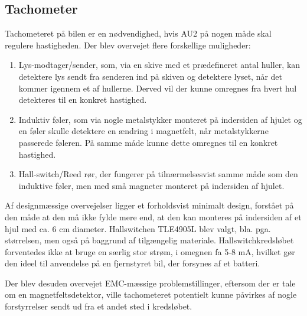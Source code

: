 \subsection{Tachometer}

Tachometeret på bilen er en nødvendighed, hvis AU2 på nogen måde skal regulere hastigheden. Der blev overvejet flere forskellige muligheder:
\begin{enumerate}
	\item Lys-modtager/sender, som, via en skive med et prædefineret antal huller, kan detektere lys sendt fra senderen ind på skiven og detektere lyset, når det kommer igennem et af hullerne. Derved vil der kunne omregnes fra hvert hul detekteres til en konkret hastighed.
	\item Induktiv føler, som via nogle metalstykker monteret på indersiden af hjulet og en føler skulle detektere en ændring i magnetfelt, når metalstykkerne passerede føleren. På samme måde kunne dette omregnes til en konkret hastighed.
	\item Hall-switch/Reed rør, der fungerer på tilnærmelsesvist samme måde som den induktive føler, men med små magneter monteret på indersiden af hjulet. 
\end{enumerate}

Af designmæssige overvejelser ligger et forholdsvist minimalt design, forstået på den måde at den må ikke fylde mere end, at den kan monteres på indersiden af et hjul med ca. 6 cm diameter. Hallswitchen TLE4905L \cite{lib:tacho} blev valgt, bla. pga. størrelsen, men også på baggrund af tilgængelig materiale. Hallswitchkredsløbet forventedes ikke at bruge en særlig stor strøm, i omegnen fa 5-8 mA, hvilket gør den ideel til anvendelse på en fjernstyret bil, der forsynes af et batteri. 

Der blev desuden overvejet EMC-mæssige problemstillinger, eftersom der er tale om en magnetfeltsdetektor, ville tachometeret potentielt kunne påvirkes af nogle forstyrrelser sendt ud fra et andet sted i kredsløbet.